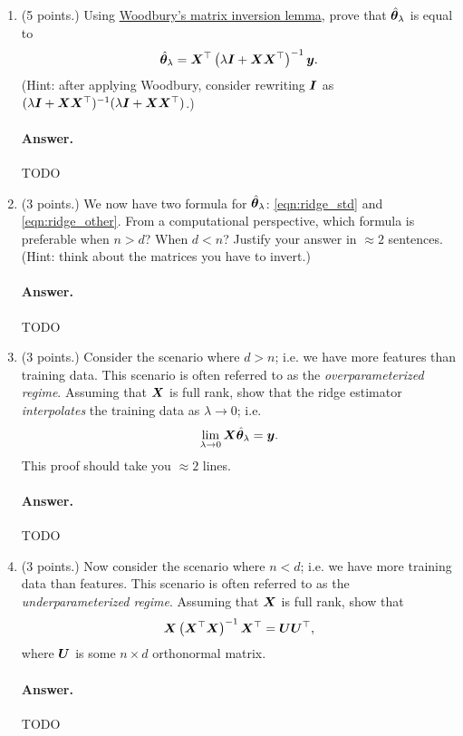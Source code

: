 \documentclass[11pt,letterpaper]{article}
\newenvironment{answer}{%
    \vspace{1em}
    \color{black}
    \paragraph{Answer.}
  }{%
    \vspace{1em}
  }
\begin{document}
\begin{enumerate}
  \item (5 points.)
    Using \href{https://en.wikipedia.org/wiki/Woodbury_matrix_identity}{Woodbury's matrix inversion lemma},
    prove that $\hat{{\bm{\theta}}}_\lambda$ is equal to
    \begin{equation}
      \hat{{\bm{\theta}}}_\lambda = {\bm{X}}^\top \left( \lambda {\bm{I}} + {\bm{X}} {\bm{X}}^\top \right)^{-1} {\bm{y}}.
      \label{eqn:ridge_other}
    \end{equation}
    (Hint: after applying Woodbury, consider rewriting ${\bm{I}}$ as
    $(\lambda {\bm{I}} + {\bm{X}} {\bm{X}}^\top)^{-1} (\lambda {\bm{I}} + {\bm{X}} {\bm{X}}^\top)$.)

\begin{answer}
  TODO
\end{answer}

  \item (3 points.)
    We now have two formula for $\hat{{\bm{\theta}}}_\lambda$: \cref{eqn:ridge_std} and \cref{eqn:ridge_other}.
    From a computational perspective, which formula is preferable when $n > d$?
    When $d < n$?
    Justify your answer in $\approx 2$ sentences.
    (Hint: think about the matrices you have to invert.)

\begin{answer}
  TODO
\end{answer}

  \item (3 points.)
    Consider the scenario where $d > n$; i.e. we have more features than training data.
    This scenario is often referred to as the \emph{overparameterized regime}.
    Assuming that ${\bm{X}}$ is full rank,
    show that the ridge estimator \emph{interpolates} the training data as $\lambda \to 0$;
    i.e.
    \[
      \lim_{\lambda \to 0} {\bm{X}} \hat{{\bm{\theta}}}_\lambda = {\bm{y}}.
    \]
    This proof should take you $\approx 2$ lines.

\begin{answer}
  TODO
\end{answer}

  \item (3 points.)
    Now consider the scenario where $n < d$; i.e. we have more training data than features.
    This scenario is often referred to as the \emph{underparameterized regime}.
    Assuming that ${\bm{X}}$ is full rank,
    show that
    \[
      {\bm{X}} \left( {\bm{X}}^\top {\bm{X}} \right)^{-1} {\bm{X}}^\top = {\bm{U}} {\bm{U}}^\top,
    \]
    where ${\bm{U}}$ is some $n \times d$ orthonormal matrix.

\begin{answer}
  TODO
\end{answer}


\end{enumerate}
\end{document}
